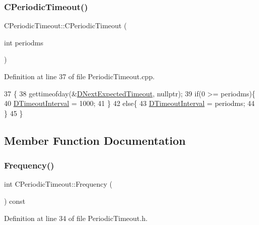 \subsubsection{\texorpdfstring{C\+Periodic\+Timeout()}{CPeriodicTimeout()}}
{\footnotesize\ttfamily C\+Periodic\+Timeout\+::\+C\+Periodic\+Timeout (\begin{DoxyParamCaption}\item[{int}]{periodms }\end{DoxyParamCaption})}



Definition at line 37 of file Periodic\+Timeout.\+cpp.


\begin{DoxyCode}
37                                               \{
38     gettimeofday(&\hyperlink{classCPeriodicTimeout_ae85c3dd7526ee6b538b7c6478133013c}{DNextExpectedTimeout}, \textcolor{keyword}{nullptr});
39     \textcolor{keywordflow}{if}(0 >= periodms)\{
40         \hyperlink{classCPeriodicTimeout_ab0c2b821c02366c9638a66eced3c1f34}{DTimeoutInterval} = 1000;        
41     \}
42     \textcolor{keywordflow}{else}\{
43         \hyperlink{classCPeriodicTimeout_ab0c2b821c02366c9638a66eced3c1f34}{DTimeoutInterval} = periodms;    
44     \}
45 \}
\end{DoxyCode}


\subsection{Member Function Documentation}
\hypertarget{classCPeriodicTimeout_af5a198bf926337b0f4470d0b77bca542}{}\label{classCPeriodicTimeout_af5a198bf926337b0f4470d0b77bca542} 
\subsubsection{\texorpdfstring{Frequency()}{Frequency()}}
{\footnotesize\ttfamily int C\+Periodic\+Timeout\+::\+Frequency (\begin{DoxyParamCaption}{ }\end{DoxyParamCaption}) const\hspace{0.3cm}{\ttfamily [inline]}}



Definition at line 34 of file Periodic\+Timeout.\+h.


